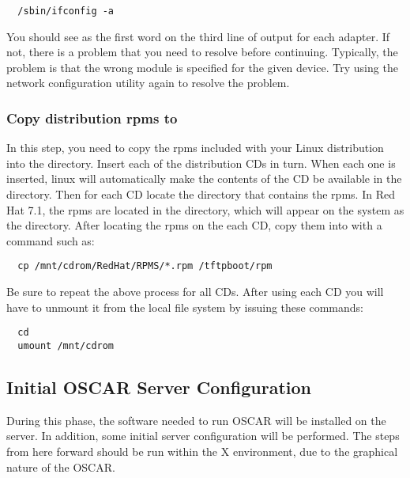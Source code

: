 \begin{verbatim}
  /sbin/ifconfig -a
\end{verbatim}
  
You should see  as the first word on the third line of output
for each adapter. If not, there is a problem that you need to resolve
before continuing. Typically, the problem is that the wrong module is
specified for the given device. Try using the network configuration
utility again to resolve the problem.
  
\subsubsection{Copy distribution rpms to }
\label{det:rpmcopy}

In this step, you need to copy the rpms included with your Linux
distribution into the  directory.  Insert each of
the distribution CDs in turn.  When each one is inserted, linux will
automatically make the contents of the CD be available in the
 directory.  Then for each CD locate the directory
that contains the rpms.  In Red Hat 7.1, the rpms are located in the
 directory, which will appear on the system as the
 directory.  After locating the rpms on
the each CD, copy them into  with a command such
as:

\begin{verbatim}
  cp /mnt/cdrom/RedHat/RPMS/*.rpm /tftpboot/rpm
\end{verbatim}
  
Be sure to repeat the above process for all CDs. 
After using each CD you will have to unmount it from the local
file system by issuing these commands:

\begin{verbatim}
  cd
  umount /mnt/cdrom
\end{verbatim}

  
\subsection{Initial OSCAR Server Configuration}

During this phase, the software needed to run OSCAR will be installed
on the server. In addition, some initial server configuration will be
performed. The steps from here forward should be run within the X
environment, due to the graphical nature of the OSCAR.

